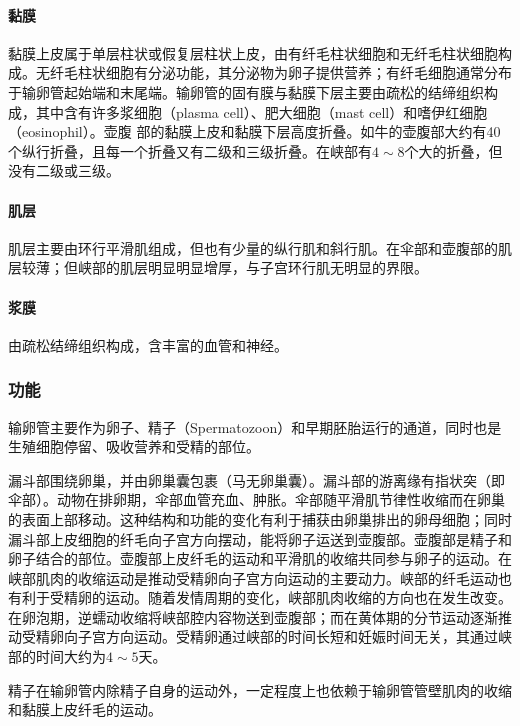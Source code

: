 \paragraph{黏膜}

黏膜上皮属于单层柱状或假复层柱状上皮，由有纤毛柱状细胞和无纤毛柱状细胞构成。无纤毛柱状细胞有分泌功能，其分泌物为卵子提供营养；有纤毛细胞通常分布于输卵管起始端和末尾端。输卵管的固有膜与黏膜下层主要由疏松的结缔组织构成，其中含有许多浆细胞（plasma cell）、肥大细胞（mast cell）和嗜伊红细胞（eosinophil）。壶腹 部的黏膜上皮和黏膜下层高度折叠。如牛的壶腹部大约有40个纵行折叠，且每一个折叠又有二级和三级折叠。在峡部有$ 4\sim 8 $个大的折叠，但没有二级或三级。


\paragraph{肌层}

肌层主要由环行平滑肌组成，但也有少量的纵行肌和斜行肌。在伞部和壶腹部的肌层较薄；但峡部的肌层明显明显增厚，与子宫环行肌无明显的界限。

\paragraph{浆膜}

由疏松结缔组织构成，含丰富的血管和神经。

\subsubsection{功能}

输卵管主要作为卵子、精子（Spermatozoon）和早期胚胎运行的通道，同时也是生殖细胞停留、吸收营养和受精的部位。

漏斗部围绕卵巢，并由卵巢囊包裹（马无卵巢囊）。漏斗部的游离缘有指状突（即伞部）。动物在排卵期，伞部血管充血、肿胀。伞部随平滑肌节律性收缩而在卵巢的表面上部移动。这种结构和功能的变化有利于捕获由卵巢排出的卵母细胞；同时漏斗部上皮细胞的纤毛向子宫方向摆动，能将卵子运送到壶腹部。壶腹部是精子和卵子结合的部位。壶腹部上皮纤毛的运动和平滑肌的收缩共同参与卵子的运动。在峡部肌肉的收缩运动是推动受精卵向子宫方向运动的主要动力。峡部的纤毛运动也有利于受精卵的运动。随着发情周期的变化，峡部肌肉收缩的方向也在发生改变。在卵泡期，逆蠕动收缩将峡部腔内容物送到壶腹部；而在黄体期的分节运动逐渐推动受精卵向子宫方向运动。受精卵通过峡部的时间长短和妊娠时间无关，其通过峡部的时间大约为$ 4\sim 5 $天。

精子在输卵管内除精子自身的运动外，一定程度上也依赖于输卵管管壁肌肉的收缩和黏膜上皮纤毛的运动。

